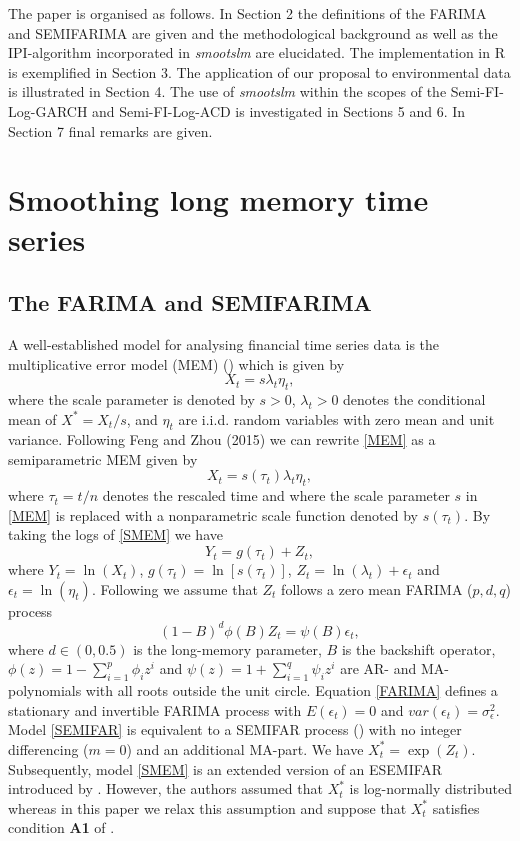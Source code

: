 \documentclass[12pt]{article}
\begin{document}
The paper is organised as follows. In Section 2 the definitions of the FARIMA and SEMIFARIMA are given and the methodological background as well as the IPI-algorithm incorporated in \textit{smootslm} are elucidated. The implementation in R is exemplified in Section 3. The application of our proposal to environmental data is illustrated in Section 4. The use of \textit{smootslm} within the scopes of the Semi-FI-Log-GARCH and Semi-FI-Log-ACD is investigated in Sections 5 and 6. In Section 7 final remarks are given.

\section{Smoothing long memory time series}

\subsection{The FARIMA and SEMIFARIMA}
A well-established model for  analysing financial time series data is the multiplicative error model (MEM) (\cite{engle2002dynamic})  which is given by 
\begin{equation}
\label{MEM}
X_t=s \lambda_t \eta_t,
\end{equation}
where the scale parameter is denoted by $s >0$, $\lambda_t >0$ denotes the conditional mean of $X^*=X_t/s$, and $\eta_t$ are i.i.d. random variables with zero mean and unit variance. Following Feng and Zhou (2015) we can rewrite \eqref{MEM} as a semiparametric MEM given by
\begin{equation}
\label{SMEM}
X_t=s(\tau_t)\lambda_t \eta_t,
\end{equation}   
where $\tau_t=t/n$ denotes the rescaled time and where the scale parameter $s$ in \eqref{MEM} is replaced with a nonparametric scale function denoted by $s(\tau_t)$. 
By taking the logs of \eqref{SMEM} we have
\begin{equation}
\label{SEMIFAR}
Y_t=g(\tau_t) + Z_t,
\end{equation}
where $Y_t=\ln(X_t)$, $g(\tau_t)=\ln[s(\tau_t)]$, $Z_t=\ln(\lambda_t) + \epsilon_t$ and $\epsilon_t=\ln(\eta_t)$. Following \citet{beran2002semifar} we assume that $Z_t$ follows a zero mean FARIMA ($p, d, q$) process 
\begin{equation}
\label{FARIMA}
(1-B)^d\phi(B)Z_t =\psi(B)\epsilon_t,
\end{equation}
where $d \in (0,0.5)$ is the long-memory parameter, $B$ is the backshift operator, $\phi(z)=1-\sum_{i=1}^{p}\phi_iz^i$ and  $\psi(z)=1+\sum_{i=1}^{q}\psi_iz^i$ are AR- and MA-polynomials with all roots outside the unit circle. Equation \eqref{FARIMA} defines a stationary and invertible FARIMA process with $E(\epsilon_t)=0$ and $var(\epsilon_t)=\sigma^2_{\epsilon}$. Model \eqref{SEMIFAR} is equivalent to a SEMIFAR process (\cite{beran2002semifar}) with no integer differencing ($m=0$) and an additional MA-part. We have $X^*_t = \exp(Z_t)$. Subsequently, model \eqref{SMEM} is an extended version of an ESEMIFAR introduced by \citet{beran2015modelling}. However, the authors assumed that $X^*_t$ is log-normally distributed whereas in this paper we relax this assumption and suppose that $X_t^*$ satisfies condition \textbf{A1} of \citet{feng2020fractionally}.
\end{document}
